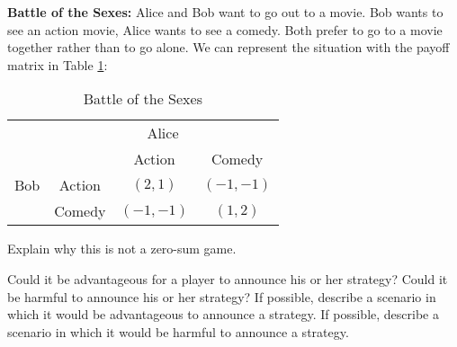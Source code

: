 \begin{example}\label{E:battle of sexes}\textbf{Battle of the Sexes:}  Alice and Bob  want to go out to a movie. Bob wants to see an action movie, Alice wants to see a comedy. Both prefer to go to a movie together rather than to go alone. We can represent the situation with the payoff matrix in Table \ref{T:battleofsexes}:



\begin{table}[h]
\centering

\begin{tabular}{cccc}
                      & \multicolumn{3}{c}{Alice}                                                  \\ \cline{2-4} 
\multicolumn{1}{l|}{} & \multicolumn{1}{l|}{} & \multicolumn{1}{c|}{Action} & \multicolumn{1}{c|}{Comedy} \\ \cline{2-4} 
\multicolumn{1}{l|}{Bob} & \multicolumn{1}{c|}{Action} & \multicolumn{1}{c|}{$(2, 1)$} & \multicolumn{1}{c|}{$(-1, -1)$} \\ \cline{2-4} 
\multicolumn{1}{l|}{} & \multicolumn{1}{c|}{Comedy} & \multicolumn{1}{c|}{$(-1, -1)$} & \multicolumn{1}{c|}{$(1, 2)$} \\ \cline{2-4} 
\end{tabular}
\caption{Battle of the Sexes}
\label{T:battleofsexes}
\end{table}
\end{example}

\begin{xca}\label{E:BoSnotzerosum}
Explain why this is not a zero-sum game. 
\end{xca}

\begin{xca}\label{E:BoSannounce}
Could it be advantageous for a player to announce his or her strategy? Could it be harmful to announce his or her strategy? If possible, describe a scenario  in which it would be advantageous to announce a strategy. If possible, describe a scenario  in which it would be harmful to announce a strategy.
\end{xca}

